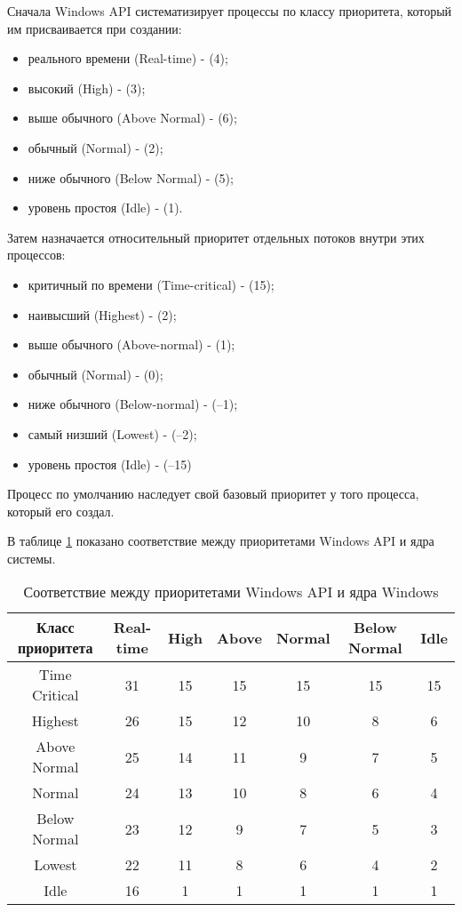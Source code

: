 Сначала Windows API систематизирует процессы по классу приоритета, который им присваивается при создании:
\begin{itemize}
    \item реального времени (Real-time) - (4);
    \item высокий (High) - (3);
    \item выше обычного (Above Normal) - (6);
    \item обычный (Normal) - (2);
    \item ниже обычного (Below Normal) - (5);
    \item уровень простоя (Idle) - (1).
\end{itemize}

Затем назначается относительный приоритет отдельных потоков внутри этих процессов:
\begin{itemize}
    \item критичный по времени (Time-critical) - (15);
    \item наивысший (Highest) - (2);
    \item выше обычного (Above-normal) - (1);
    \item обычный (Normal) - (0);
    \item ниже обычного (Below-normal) - (–1);
    \item самый низший (Lowest) - (–2);
    \item уровень простоя (Idle) - (–15)
\end{itemize}

Процесс по умолчанию наследует свой базовый приоритет у того процесса, который его создал.

В таблице \ref{tab:prioritet} показано соответствие между приоритетами Windows API и ядра системы.

\begin{table}[h]
    \caption{Соответствие между приоритетами Windows API и ядра Windows}
    \begin{center}
        \begin{tabular}{|c|c|c|c|c|c|c|}
            \hline
            Класс приоритета & Real-time & High & Above &
            Normal & Below Normal & Idle \\ \hline
            Time Critical & 31 & 15 & 15 & 15 & 15 & 15 \\ \hline
            Highest & 26 & 15 & 12 & 10 & 8 & 6 \\ \hline
            Above Normal & 25 & 14 & 11 & 9 & 7 & 5 \\ \hline
            Normal & 24 & 13 & 10 & 8 & 6 & 4 \\ \hline
            Below Normal & 23 & 12 & 9 & 7 & 5 & 3 \\ \hline
            Lowest & 22 & 11 & 8 & 6 & 4 & 2 \\ \hline
            Idle & 16 & 1 & 1 & 1 & 1 & 1 \\ \hline
        \end{tabular}
    \end{center}
    \label{tab:prioritet}
\end{table}

